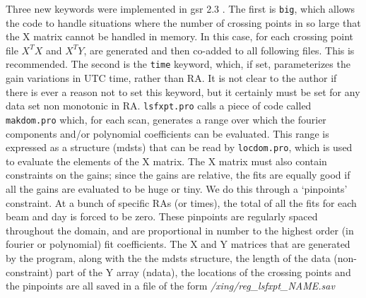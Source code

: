 \documentclass[11pt]{article}
\begin{document}
Three new keywords were implemented in gsr 2.3 . The first is \texttt{big}, which allows the code to handle situations where the number of crossing points in so large that the X matrix cannot be handled in memory. In this case, for each crossing point file $X^TX$ and $X^TY$, are generated and then co-added to all following files. This is recommended. The second is the \texttt{time} keyword, which, if set, parameterizes the gain variations in UTC time, rather than RA. It is not clear to the author if there is ever a reason not to set this keyword, but it certainly must be set for any data set non monotonic in RA. \texttt{lsfxpt.pro} calls a piece of code called \texttt{makdom.pro} which, for each scan, generates a range over which the fourier components and/or polynomial coefficients can be evaluated. This range is expressed as a structure (mdsts) that can be read by \texttt{locdom.pro}, which is used to evaluate the elements of the X matrix. The X matrix must also contain constraints on the gains; since the gains are relative, the fits are equally good if all the gains are evaluated to be huge or tiny. We do this through a `pinpoints' constraint. At a bunch of specific RAs (or times), the total of all the fits for each beam and day is forced to be zero. These pinpoints are regularly spaced throughout the domain, and are proportional in number to the highest order (in fourier or polynomial) fit coefficients. The X and Y matrices that are generated by the program, along with the the mdsts structure, the length of the data (non-constraint) part of the Y array (ndata), the locations of the crossing points and the pinpoints are all saved in a file of the form {\it /xing/reg\_lsfxpt\_NAME.sav}
\end{document}
